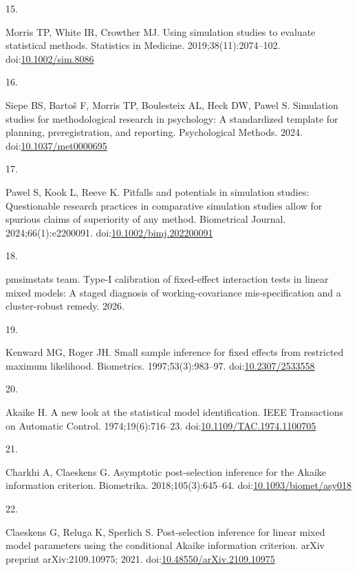 \documentclass[
  11pt,
]{article}
\newlength{\cslhangindent}
\newlength{\csllabelwidth}
\newenvironment{CSLReferences}[2] %
 {\begin{list}{}{%
  \setlength{\itemindent}{0pt}
  \setlength{\leftmargin}{0pt}
  \setlength{\parsep}{0pt}
  \ifodd #1
   \setlength{\leftmargin}{\cslhangindent}
   \setlength{\itemindent}{-1\cslhangindent}
  \fi
  \setlength{\itemsep}{#2\baselineskip}}}
 {\end{list}}
\newcommand{\CSLLeftMargin}[1]{\parbox[t]{\csllabelwidth}{\strut#1\strut}}
\newcommand{\CSLRightInline}[1]{\parbox[t]{\linewidth - \csllabelwidth}{\strut#1\strut}}
\begin{document}
\begin{CSLReferences}{0}{1}
\CSLLeftMargin{15. }%
\CSLRightInline{Morris TP, White IR, Crowther MJ. Using simulation studies to evaluate statistical methods. Statistics in Medicine. 2019;38(11):2074--102. doi:\href{https://doi.org/10.1002/sim.8086}{10.1002/sim.8086}}

\CSLLeftMargin{16. }%
\CSLRightInline{Siepe BS, Bartoš F, Morris TP, Boulesteix AL, Heck DW, Pawel S. Simulation studies for methodological research in psychology: A standardized template for planning, preregistration, and reporting. Psychological Methods. 2024. doi:\href{https://doi.org/10.1037/met0000695}{10.1037/met0000695}}

\CSLLeftMargin{17. }%
\CSLRightInline{Pawel S, Kook L, Reeve K. Pitfalls and potentials in simulation studies: Questionable research practices in comparative simulation studies allow for spurious claims of superiority of any method. Biometrical Journal. 2024;66(1):e2200091. doi:\href{https://doi.org/10.1002/bimj.202200091}{10.1002/bimj.202200091}}

\CSLLeftMargin{18. }%
\CSLRightInline{{pmsimstats team}. Type-{I} calibration of fixed-effect interaction tests in linear mixed models: A staged diagnosis of working-covariance mis-specification and a cluster-robust remedy. 2026.}

\CSLLeftMargin{19. }%
\CSLRightInline{Kenward MG, Roger JH. Small sample inference for fixed effects from restricted maximum likelihood. Biometrics. 1997;53(3):983--97. doi:\href{https://doi.org/10.2307/2533558}{10.2307/2533558}}

\CSLLeftMargin{20. }%
\CSLRightInline{Akaike H. A new look at the statistical model identification. IEEE Transactions on Automatic Control. 1974;19(6):716--23. doi:\href{https://doi.org/10.1109/TAC.1974.1100705}{10.1109/TAC.1974.1100705}}

\CSLLeftMargin{21. }%
\CSLRightInline{Charkhi A, Claeskens G. Asymptotic post-selection inference for the {Akaike} information criterion. Biometrika. 2018;105(3):645--64. doi:\href{https://doi.org/10.1093/biomet/asy018}{10.1093/biomet/asy018}}

\CSLLeftMargin{22. }%
\CSLRightInline{Claeskens G, Reluga K, Sperlich S. Post-selection inference for linear mixed model parameters using the conditional {Akaike} information criterion. arXiv preprint arXiv:2109.10975; 2021. doi:\href{https://doi.org/10.48550/arXiv.2109.10975}{10.48550/arXiv.2109.10975}}


\end{CSLReferences}
\end{document}
